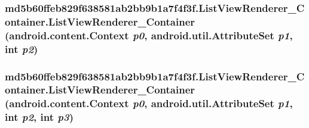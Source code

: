 \hypertarget{classmd5b60ffeb829f638581ab2bb9b1a7f4f3f_1_1_list_view_renderer___container_f8b2fbe4aa6217fcb86a29f17c80199b}{
\subsubsection[{ListViewRenderer\_\-Container}]{\setlength{\rightskip}{0pt plus 5cm}md5b60ffeb829f638581ab2bb9b1a7f4f3f.ListViewRenderer\_\-Container.ListViewRenderer\_\-Container (android.content.Context {\em p0}, \/  android.util.AttributeSet {\em p1}, \/  int {\em p2})}}
\label{classmd5b60ffeb829f638581ab2bb9b1a7f4f3f_1_1_list_view_renderer___container_f8b2fbe4aa6217fcb86a29f17c80199b}


\hypertarget{classmd5b60ffeb829f638581ab2bb9b1a7f4f3f_1_1_list_view_renderer___container_2b3ef6ca6e9196714d957f000cff52e3}{
\subsubsection[{ListViewRenderer\_\-Container}]{\setlength{\rightskip}{0pt plus 5cm}md5b60ffeb829f638581ab2bb9b1a7f4f3f.ListViewRenderer\_\-Container.ListViewRenderer\_\-Container (android.content.Context {\em p0}, \/  android.util.AttributeSet {\em p1}, \/  int {\em p2}, \/  int {\em p3})}}
\label{classmd5b60ffeb829f638581ab2bb9b1a7f4f3f_1_1_list_view_renderer___container_2b3ef6ca6e9196714d957f000cff52e3}




